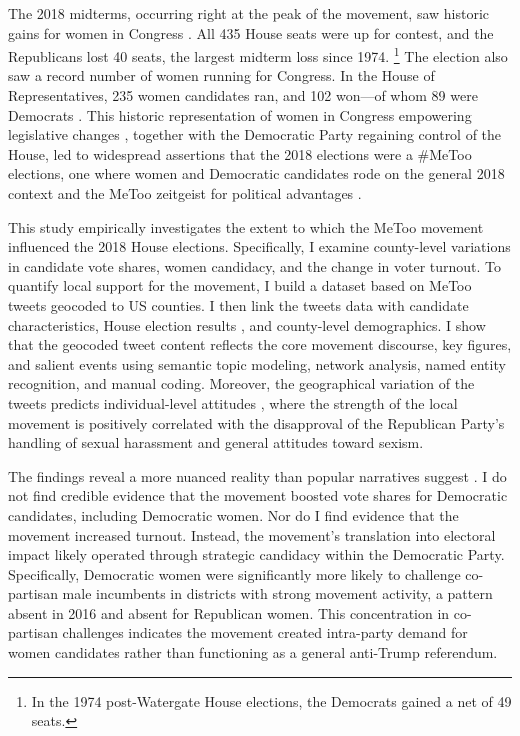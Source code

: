 \documentclass[manuscript,screen,nonacm,11pt,acm]{acmart}
\newcommand{\R}{Republican}
\begin{document}
The 2018 midterms, occurring right at the peak of the movement, saw historic gains for women in Congress \citep{cawp}.
All 435 House seats were up for contest, and the \R{}s lost 40 seats, the largest midterm loss since 1974.%
\footnote{In the 1974 post-Watergate House elections, the Democrats gained a net of 49 seats.}
The election also saw a record number of women running for Congress.
In the House of Representatives, 235 women candidates ran, and 102 won---of whom 89 were Democrats \citep{cawp}.
This historic representation of women in Congress empowering legislative changes \citep{Ban2022}, together with the Democratic Party regaining control of the House, led to widespread assertions that the 2018 elections were a \#MeToo elections, one where women and Democratic candidates rode on the general 2018 context and the MeToo zeitgeist for political advantages \citep{genderwatch2018, telegraphMetoo, tippett2018-bi,thomsen2020}.

This study empirically investigates the extent to which the MeToo movement influenced the 2018 House elections.
Specifically, I examine county-level variations in candidate vote shares, women candidacy, and the change in voter turnout. 
To quantify local support for the movement, I build a dataset based on MeToo tweets geocoded to US counties.
I then link the tweets data with candidate characteristics, House election results \citep{mitCountyPres,mitCountyHouse2016}, and county-level demographics.
I show that the geocoded tweet content reflects the core movement discourse, key figures, and salient events using semantic topic modeling, network analysis, named entity recognition, and manual coding.
Moreover, the geographical variation of the tweets predicts individual-level attitudes \citep{voter}, where the strength of the local movement is positively correlated with the disapproval of the Republican Party's handling of sexual harassment and general attitudes toward sexism.

The findings reveal a more nuanced reality than popular narratives suggest \citep{Lucas2021, CarsonHitefield2018, Gibson2019, dittmar2020, DeMora2023}.
I do not find credible evidence that the movement boosted vote shares for Democratic candidates, including Democratic women.
Nor do I find evidence that the movement increased turnout.
Instead, the movement's translation into electoral impact likely operated through strategic candidacy within the Democratic Party.
Specifically, Democratic women were significantly more likely to challenge co-partisan male incumbents in districts with strong movement activity, a pattern absent in 2016 and absent for Republican women.
This concentration in co-partisan challenges indicates the movement created intra-party demand for women candidates rather than functioning as a general anti-Trump referendum.
\end{document}
